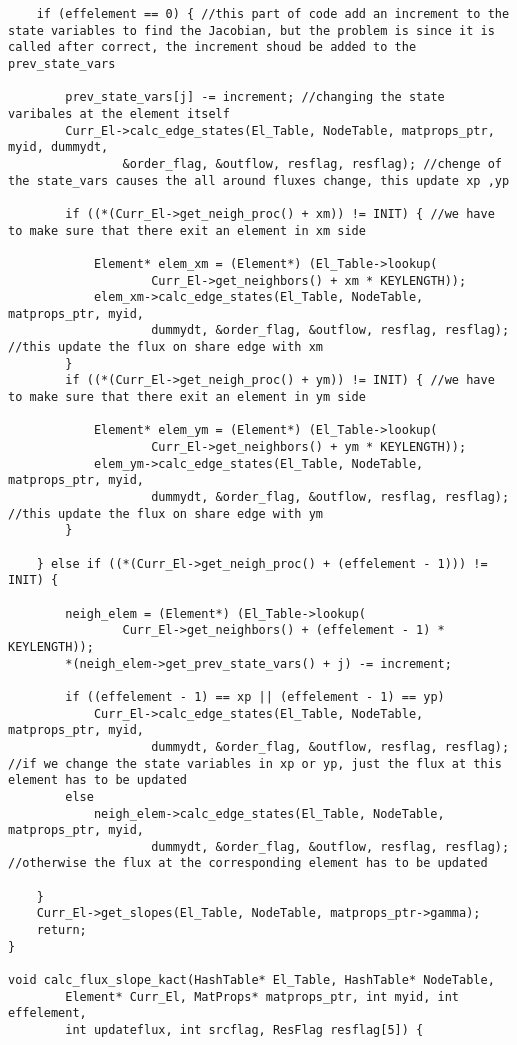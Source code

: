 \documentclass[a4paper,10pt]{article}
\begin{document}
\begin{lstlisting}
	if (effelement == 0) { //this part of code add an increment to the state variables to find the Jacobian, but the problem is since it is called after correct, the increment shoud be added to the prev_state_vars

		prev_state_vars[j] -= increment; //changing the state varibales at the element itself
		Curr_El->calc_edge_states(El_Table, NodeTable, matprops_ptr, myid, dummydt,
				&order_flag, &outflow, resflag, resflag); //chenge of the state_vars causes the all around fluxes change, this update xp ,yp

		if ((*(Curr_El->get_neigh_proc() + xm)) != INIT) { //we have to make sure that there exit an element in xm side

			Element* elem_xm = (Element*) (El_Table->lookup(
					Curr_El->get_neighbors() + xm * KEYLENGTH));
			elem_xm->calc_edge_states(El_Table, NodeTable, matprops_ptr, myid,
					dummydt, &order_flag, &outflow, resflag, resflag); //this update the flux on share edge with xm
		}
		if ((*(Curr_El->get_neigh_proc() + ym)) != INIT) { //we have to make sure that there exit an element in ym side

			Element* elem_ym = (Element*) (El_Table->lookup(
					Curr_El->get_neighbors() + ym * KEYLENGTH));
			elem_ym->calc_edge_states(El_Table, NodeTable, matprops_ptr, myid,
					dummydt, &order_flag, &outflow, resflag, resflag); //this update the flux on share edge with ym
		}

	} else if ((*(Curr_El->get_neigh_proc() + (effelement - 1))) != INIT) {

		neigh_elem = (Element*) (El_Table->lookup(
				Curr_El->get_neighbors() + (effelement - 1) * KEYLENGTH));
		*(neigh_elem->get_prev_state_vars() + j) -= increment;

		if ((effelement - 1) == xp || (effelement - 1) == yp)
			Curr_El->calc_edge_states(El_Table, NodeTable, matprops_ptr, myid,
					dummydt, &order_flag, &outflow, resflag, resflag); //if we change the state variables in xp or yp, just the flux at this element has to be updated
		else
			neigh_elem->calc_edge_states(El_Table, NodeTable, matprops_ptr, myid,
					dummydt, &order_flag, &outflow, resflag, resflag); //otherwise the flux at the corresponding element has to be updated

	}
	Curr_El->get_slopes(El_Table, NodeTable, matprops_ptr->gamma);
	return;
}

void calc_flux_slope_kact(HashTable* El_Table, HashTable* NodeTable,
		Element* Curr_El, MatProps* matprops_ptr, int myid, int effelement,
		int updateflux, int srcflag, ResFlag resflag[5]) {


\end{lstlisting}
\end{document}
